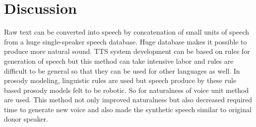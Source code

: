 


\section{Discussion}
Raw text can be converted into speech by concatenation of small units of speech from a huge single-speaker speech database.
Huge database makes it possible to produce more natural sound. TTS system development can be based on rules for
generation of speech but this method can take intensive labor and rules are
difficult to be general so that they can be used for other languages as well. In prosody modeling, linguistic rules are used
\cite{klatt1987review} \cite{pierrehumbert1981synthesizing} but speech produce by these rule based prosody models felt to be robotic. So
for naturalness of voice unit method are used. This method not only improved naturalness but also decreased required time to
generate new voice and also made the synthetic speech similar to original donor speaker.

